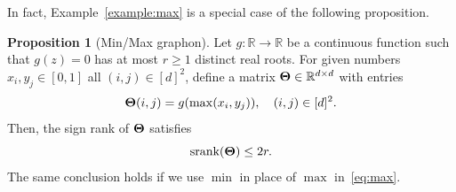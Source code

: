 \documentclass[11pt]{article}
\theoremstyle{plain}
\theoremstyle{definition}
\newtheorem{prop}{Proposition}
\def\srank{\textup{srank}}
\begin{document}
In fact, Example~\ref{example:max} is a special case of the following proposition. 

\begin{prop}[Min/Max graphon] Let $g\colon \mathbb{R}\to \mathbb{R}$ be a continuous function such that $g(z)=0$ has at most $r\geq 1$ distinct real roots. For given numbers $x_i, y_j\in[0,1]$ all $(i,j)\in[d]^2$, define a matrix $\bm{\Theta} \in\mathbb{R}^{d\times d}$ with entries
\begin{equation}\label{eq:max}
\bm{\Theta}(i,j)=g(\max(x_i,y_j)), \quad (i,j)\in[d]^2.
\end{equation}
Then, the sign rank of $\bm{\Theta}$ satisfies
\[
\srank(\mTheta)\leq 2r.
\]
The same conclusion holds if we use $\min$ in place of $\max$ in~\eqref{eq:max}. 
\end{prop}
\end{document}
